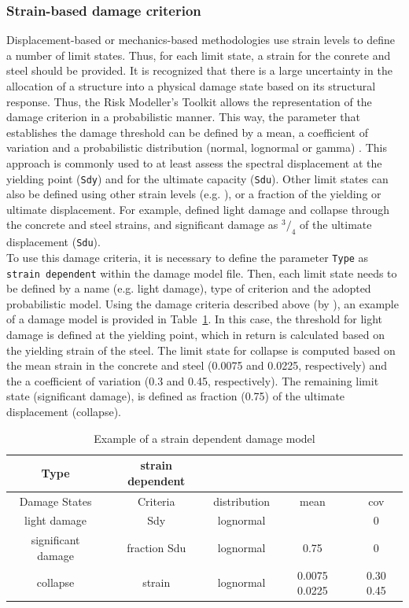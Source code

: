 \subsubsection{Strain-based damage criterion}
\label{subsubsec:strain-dmg}
Displacement-based \citep{CrowleyEtAl2004} or mechanics-based \citep{BorziEtAl2008b} methodologies use strain levels to define a number of limit states. Thus, for each limit state, a strain for the conrete and steel should be provided. It is recognized that there is a large uncertainty in the allocation of a structure into a physical damage state based on its structural response. Thus, the Risk Modeller's Toolkit allows the representation of the damage criterion in a probabilistic manner. This way, the parameter that establishes the damage threshold can be defined by a mean, a coefficient of variation and a probabilistic distribution (normal, lognormal or gamma) \citep{SilvaEtAl2013}. This approach is commonly used to at least assess the spectral displacement at the yielding point (\verb=Sdy=) and for the ultimate capacity (\verb=Sdu=). Other limit states can also be defined using other strain levels (e.g. \cite{CrowleyEtAl2004}), or a fraction of the yielding or ultimate displacement. For example, \cite{BorziEtAl2008b} defined light damage and collapse through the concrete and steel strains, and significant damage as $^3/_4$ of the ultimate displacement (\verb=Sdu=).\\

To use this damage criteria, it is necessary to define the parameter \verb=Type= as \verb=strain dependent= within the damage model file. Then, each limit state needs to be defined by a name (e.g. light damage), type of criterion and the adopted probabilistic model. Using the damage criteria described above (by \cite{BorziEtAl2008b}), an example of a damage model is provided in Table~\ref{table:strain-dmg}. In this case, the threshold for light damage is defined at the yielding point, which in return is calculated based on the yielding strain of the steel. The limit state for collapse is computed based on the mean strain in the concrete and steel (0.0075 and 0.0225, respectively) and the a coefficient of variation (0.3 and 0.45, respectively). The remaining limit state (significant damage), is defined as fraction (0.75) of the ultimate displacement (collapse).

\begin {table}[!htbp]
\caption{Example of a strain dependent damage model}
\label{table:strain-dmg}
\begin{center}
  \begin{tabular}{ | c | c | c | c | c |}
  \hline
Type & strain dependent &  &  &  \\ \hline
Damage States & Criteria & distribution & mean & cov  \\ \hline
light damage & Sdy & lognormal &  & 0 \\ \hline
significant damage & fraction Sdu & lognormal & 0.75 & 0 \\ \hline
collapse & strain & lognormal & 0.0075 0.0225 & 0.30 0.45 \\ \hline
  \end{tabular}
\end{center}
\end{table}


